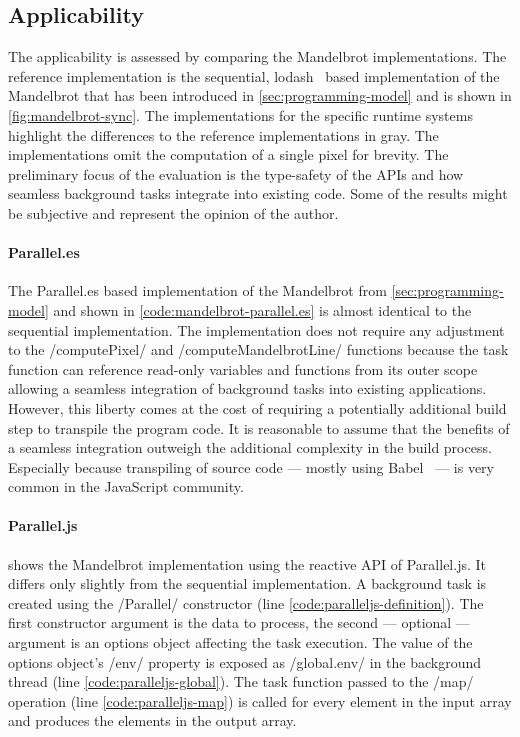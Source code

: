 \subsection{Applicability}
The applicability is assessed by comparing the Mandelbrot implementations. The reference implementation is the sequential, lodash~\cite{lodash} based implementation of the Mandelbrot that has been introduced in \cref{sec:programming-model} and is shown in \cref{fig:mandelbrot-sync}. The implementations for the specific runtime systems highlight the differences to the reference implementations in gray. The implementations omit the computation of a single pixel for brevity. The preliminary focus of the evaluation is the type-safety of the APIs and how seamless background tasks integrate into existing code. Some of the results might be subjective and represent the opinion of the author. 

\paragraph{Parallel.es}
The Parallel.es based implementation of the Mandelbrot from \cref{sec:programming-model} and shown in  \cref{code:mandelbrot-parallel.es} is almost identical to the sequential implementation. The implementation does not require any adjustment to the \javascriptinline/computePixel/ and \javascriptinline/computeMandelbrotLine/ functions because the task function can reference read-only variables and functions from its outer scope allowing a seamless integration of background tasks into existing applications. However, this liberty comes at the cost of requiring a potentially additional build step to transpile the program code. It is reasonable to assume that the benefits of a seamless integration outweigh the additional complexity in the build process. Especially because transpiling of source code --- mostly using Babel~\cite{babel} --- is very common in the JavaScript community. 

\paragraph{Parallel.js}
 shows the Mandelbrot implementation using the reactive API of Parallel.js. It differs only slightly from the sequential implementation. A background task is created using the \javascriptinline/Parallel/ constructor (line \ref{code:paralleljs-definition}). The first constructor argument is the data to process, the second --- optional --- argument is an options object affecting the task execution. The value of the options object's \javascriptinline/env/ property is exposed as \javascriptinline/global.env/ in the background thread (line \ref{code:paralleljs-global}). The task function passed to the \javascriptinline/map/ operation (line \ref{code:paralleljs-map}) is called for every element in the input array and produces the elements in the output array.


